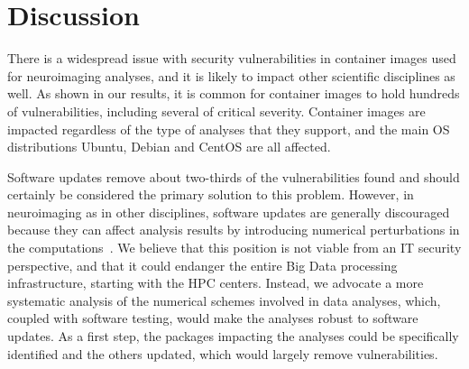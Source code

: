 \documentclass[a4paper,num-refs]{oup-contemporary}
\begin{document}





\section{Discussion}

There is a widespread issue with security vulnerabilities in container
images used for neuroimaging analyses, and it is likely to impact other
scientific disciplines as well. As shown in our results, it is common for container images
to hold hundreds of vulnerabilities, including several of critical
severity. Container images are impacted regardless of the type of analyses
that they support, and the main OS distributions Ubuntu, Debian and CentOS
are all affected.

Software updates remove about two-thirds of the vulnerabilities found and
should certainly be considered the primary solution to this problem.
However, in neuroimaging as in other disciplines, software updates are
generally discouraged because they can affect analysis results by
introducing numerical perturbations in the
computations~\cite{gronenschild2012effects,glatard2015reproducibility}. We
believe that this position is not viable from an IT security perspective,
and that it could endanger the entire Big Data processing infrastructure,
starting with the HPC centers. Instead, we advocate a more systematic
analysis of the numerical schemes involved in data analyses, which, coupled
with software testing, would make the analyses robust to software updates.
As a first step, the packages impacting the analyses could be specifically
identified and the others updated, which would largely remove
vulnerabilities.
\end{document}
